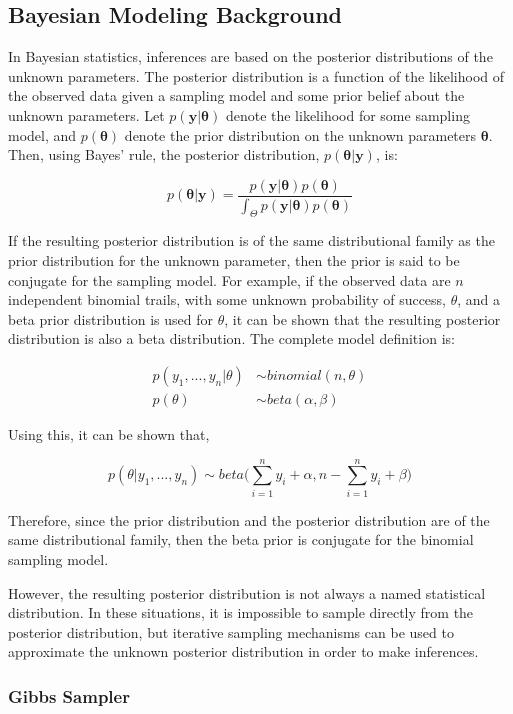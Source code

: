 \documentclass[12pt]{article}\usepackage[]{graphicx}\usepackage[]{color}
\begin{document}
\subsection{Bayesian Modeling Background}

In Bayesian statistics, inferences are based on the posterior distributions of the unknown parameters. The posterior distribution is a function of the likelihood of the observed data given a sampling model and some prior belief about the unknown parameters. Let $p(\bm{y}|\bm{\theta})$ denote the likelihood for some sampling model, and $p(\bm{\theta})$ denote the prior distribution on the unknown parameters $\bm{\theta}$. Then, using Bayes' rule, the posterior distribution, $p(\bm{\theta}|\bm{y})$, is: 

$$p(\bm{\theta}|\bm{y}) = \frac{p(\bm{y}|\bm{\theta})p(\bm{\theta})}{\int_\Theta p(\bm{y}|\bm{\theta})p(\bm{\theta})}$$

\noindent If the resulting posterior distribution is of the same distributional family as the prior distribution for the unknown parameter, then the prior is said to be conjugate for the sampling model. For example, if the observed data are $n$ independent binomial trails, with some unknown probability of success, $\theta$, and a beta prior distribution is used for $\theta$, it can be shown that the resulting posterior distribution is also a beta distribution. The complete model definition is: 

$$
\begin{aligned}
p(y_1, ..., y_n|\theta) &\sim binomial(n, \theta)\\
p(\theta) &\sim beta(\alpha, \beta)
\end{aligned}
$$

\noindent Using this, it can be shown that, 

$$p(\theta|y_1, ..., y_n) \sim beta \bigg( \sum_{i = 1}^n y_i + \alpha, n - \sum_{i = 1}^n y_i + \beta \bigg)$$

\noindent Therefore, since the prior distribution and the posterior distribution are of the same distributional family, then the beta prior is conjugate for the binomial sampling model.

However, the resulting posterior distribution is not always a named statistical distribution. In these situations, it is impossible to sample directly from the posterior distribution, but iterative sampling mechanisms can be used to approximate the unknown posterior distribution in order to make inferences. 

\subsubsection{Gibbs Sampler}
\end{document}
